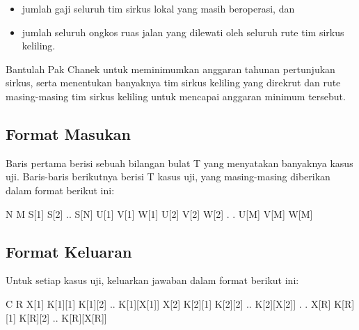 \documentclass[../main_problemset.tex]{subfiles} %
\begin{document}
\begin{itemize}
	\item jumlah gaji seluruh tim sirkus lokal yang masih beroperasi, dan
	\item jumlah seluruh ongkos ruas jalan yang dilewati oleh seluruh rute tim sirkus keliling.
\end{itemize}

Bantulah Pak Chanek untuk meminimumkan anggaran tahunan pertunjukan sirkus, serta menentukan banyaknya tim sirkus keliling yang direkrut dan rute masing-masing tim sirkus keliling untuk mencapai anggaran minimum tersebut.

\subsection*{Format Masukan}

Baris pertama berisi sebuah bilangan bulat T yang menyatakan banyaknya kasus uji. Baris-baris berikutnya berisi T kasus uji, yang masing-masing diberikan dalam format berikut ini:

\begin{lcverbatim}
N M
S[1] S[2] .. S[N]
U[1] V[1] W[1]
U[2] V[2] W[2]
.
.
U[M] V[M] W[M]
\end{lcverbatim}

\pagebreak
\subsection*{Format Keluaran}

Untuk setiap kasus uji, keluarkan jawaban dalam format berikut ini:

\begin{lcverbatim}
C R
X[1] K[1][1] K[1][2] .. K[1][X[1]]
X[2] K[2][1] K[2][2] .. K[2][X[2]]
.
.
X[R] K[R][1] K[R][2] .. K[R][X[R]]
\end{lcverbatim}

\vspace{.4cm}
\end{document}
